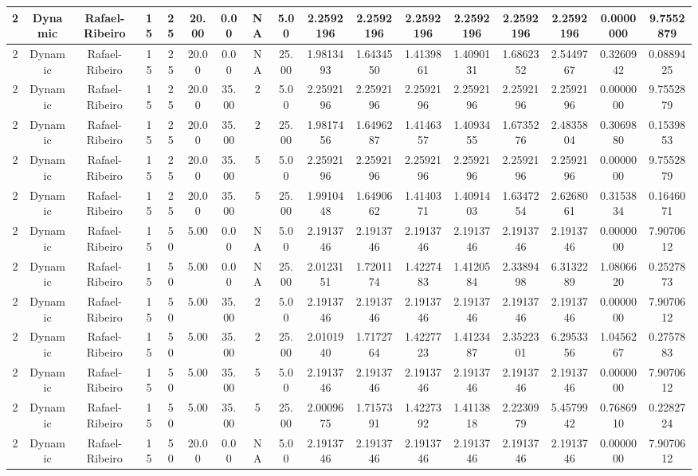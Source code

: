 \begin{longtable}{ | c | c | c | c | c | c | c | c | c | c | c | c | c | c | c | c | c | }
	\hline
	2	&	Dynamic	&	Rafael-Ribeiro	&	15	&	25	&	20.00	&	0.00	&	NA	&	5.00	&	2.2592196	&	2.2592196	&	2.2592196	&	2.2592196	&	2.2592196	&	2.2592196	&	0.0000000	&	9.7552879 \\
	\hline
	2	&	Dynamic	&	Rafael-Ribeiro	&	15	&	25	&	20.00	&	0.00	&	NA	&	25.00	&	1.9813493	&	1.6434550	&	1.4139861	&	1.4090131	&	1.6862352	&	2.5449767	&	0.3260942	&	0.0889425 \\
	\hline
	2	&	Dynamic	&	Rafael-Ribeiro	&	15	&	25	&	20.00	&	35.00	&	2	&	5.00	&	2.2592196	&	2.2592196	&	2.2592196	&	2.2592196	&	2.2592196	&	2.2592196	&	0.0000000	&	9.7552879 \\
	\hline
	2	&	Dynamic	&	Rafael-Ribeiro	&	15	&	25	&	20.00	&	35.00	&	2	&	25.00	&	1.9817456	&	1.6496287	&	1.4146357	&	1.4093455	&	1.6735276	&	2.4835804	&	0.3069880	&	0.1539853 \\
	\hline
	2	&	Dynamic	&	Rafael-Ribeiro	&	15	&	25	&	20.00	&	35.00	&	5	&	5.00	&	2.2592196	&	2.2592196	&	2.2592196	&	2.2592196	&	2.2592196	&	2.2592196	&	0.0000000	&	9.7552879 \\
	\hline
	2	&	Dynamic	&	Rafael-Ribeiro	&	15	&	25	&	20.00	&	35.00	&	5	&	25.00	&	1.9910448	&	1.6490662	&	1.4140371	&	1.4091403	&	1.6347254	&	2.6268061	&	0.3153834	&	0.1646071 \\
	\hline
	2	&	Dynamic	&	Rafael-Ribeiro	&	15	&	50	&	5.00	&	0.00	&	NA	&	5.00	&	2.1913746	&	2.1913746	&	2.1913746	&	2.1913746	&	2.1913746	&	2.1913746	&	0.0000000	&	7.9070612 \\
	\hline
	2	&	Dynamic	&	Rafael-Ribeiro	&	15	&	50	&	5.00	&	0.00	&	NA	&	25.00	&	2.0123151	&	1.7201174	&	1.4227483	&	1.4120584	&	2.3389498	&	6.3132289	&	1.0806620	&	0.2527873 \\
	\hline
	2	&	Dynamic	&	Rafael-Ribeiro	&	15	&	50	&	5.00	&	35.00	&	2	&	5.00	&	2.1913746	&	2.1913746	&	2.1913746	&	2.1913746	&	2.1913746	&	2.1913746	&	0.0000000	&	7.9070612 \\
	\hline
	2	&	Dynamic	&	Rafael-Ribeiro	&	15	&	50	&	5.00	&	35.00	&	2	&	25.00	&	2.0101940	&	1.7172764	&	1.4227723	&	1.4123487	&	2.3522301	&	6.2953356	&	1.0456267	&	0.2757883 \\
	\hline
	2	&	Dynamic	&	Rafael-Ribeiro	&	15	&	50	&	5.00	&	35.00	&	5	&	5.00	&	2.1913746	&	2.1913746	&	2.1913746	&	2.1913746	&	2.1913746	&	2.1913746	&	0.0000000	&	7.9070612 \\
	\hline
	2	&	Dynamic	&	Rafael-Ribeiro	&	15	&	50	&	5.00	&	35.00	&	5	&	25.00	&	2.0009675	&	1.7157391	&	1.4227392	&	1.4113818	&	2.2230979	&	5.4579942	&	0.7686910	&	0.2282724 \\
	\hline
	2	&	Dynamic	&	Rafael-Ribeiro	&	15	&	50	&	20.00	&	0.00	&	NA	&	5.00	&	2.1913746	&	2.1913746	&	2.1913746	&	2.1913746	&	2.1913746	&	2.1913746	&	0.0000000	&	7.9070612 \\

\end{longtable}
